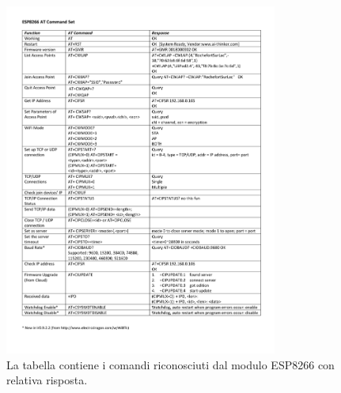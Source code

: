 \documentclass [11pt ,a4paper]{report}
\begin{document}
\begin{figure}[h]
	\centering
		\hspace*{-2cm}\includegraphics[width=0.8\textwidth]{Images/CommandsSet.pdf}
	\caption{La tabella contiene i comandi riconosciuti dal modulo ESP8266 con relativa risposta.}
	\label{fig:commands}
\end{figure}


\newpage
\end{document}
